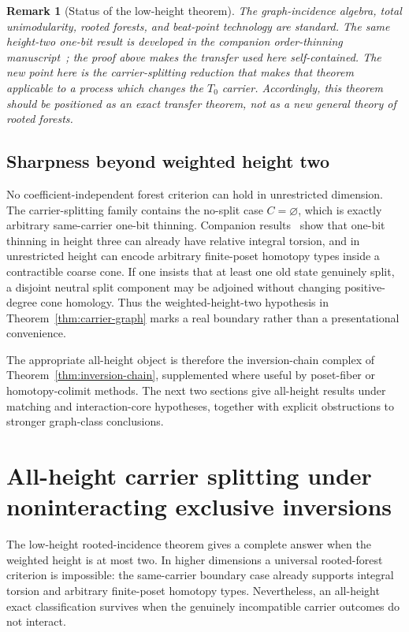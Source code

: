 \documentclass[11pt]{article}
\newtheorem{remark}[theorem]{Remark}
\begin{document}
\begin{remark}[Status of the low-height theorem]
The graph-incidence algebra, total unimodularity, rooted forests, and beat-point
technology are standard.  The same height-two one-bit result is developed in the companion
order-thinning manuscript~\cite{DroncheffThinning2026}; the proof above makes
the transfer used here self-contained.  The new point here is the
carrier-splitting reduction that makes that theorem applicable to a process which
changes the $T_0$ carrier.  Accordingly, this theorem should be positioned as an
exact transfer theorem, not as a new general theory of rooted forests.
\end{remark}

\subsection{Sharpness beyond weighted height two}

No coefficient-independent forest criterion can hold in unrestricted dimension.
The carrier-splitting family contains the no-split case $C=\varnothing$, which is
exactly arbitrary same-carrier one-bit thinning.  Companion results~\cite{DroncheffThinning2026} show that one-bit
thinning in height three can already have relative integral torsion, and in unrestricted
height can encode arbitrary finite-poset homotopy types inside a contractible coarse
cone.  If one insists that at least one old state genuinely split, a disjoint neutral
split component may be adjoined without changing positive-degree cone homology.
Thus the weighted-height-two hypothesis in Theorem~\ref{thm:carrier-graph} marks a
real boundary rather than a presentational convenience.

The appropriate all-height object is therefore the inversion-chain complex of
Theorem~\ref{thm:inversion-chain}, supplemented where useful by poset-fiber or
homotopy-colimit methods.  The next two sections give all-height results under
matching and interaction-core hypotheses, together with explicit obstructions
to stronger graph-class conclusions.


\section{All-height carrier splitting under noninteracting exclusive inversions}
\label{sec:exclusive-matching}

The low-height rooted-incidence theorem gives a complete answer when the
weighted height is at most two.  In higher dimensions a universal rooted-forest
criterion is impossible: the same-carrier boundary case already supports
integral torsion and arbitrary finite-poset homotopy types.  Nevertheless, an
all-height exact classification survives when the genuinely incompatible
carrier outcomes do not interact.
\end{document}
